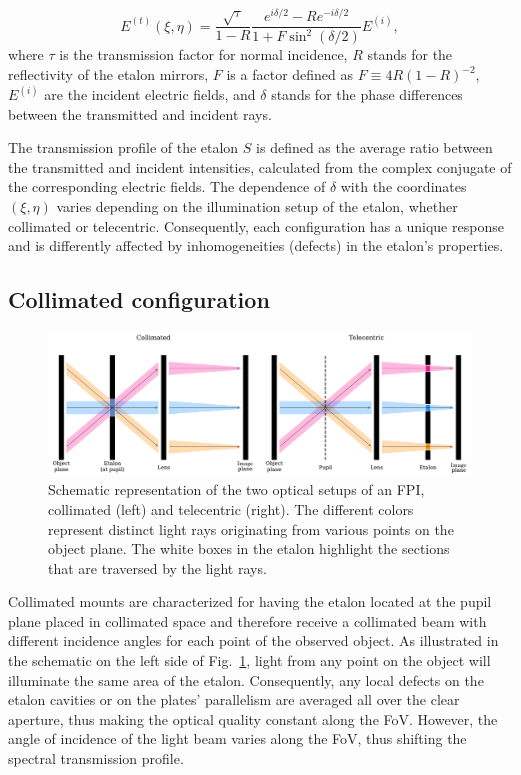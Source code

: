 \begin{equation}
  E ^{(t)}(\xi, \eta) = \frac{\sqrt{\tau}}{1 - R}\frac{e ^{i\delta / 2} - R e ^{ -i\delta / 2}}{1 + F \sin ^2 (\delta / 2)}E ^{(i)},
  \label{eq_etalon_theory: electric_transmitted}
\end{equation}
where $\tau$ is the transmission factor for normal incidence, $R$ stands for the reflectivity of the etalon mirrors, $F$ is a factor defined as $F \equiv 4R (1 - R )^{-2}$, $E^{(i)}$ are the incident electric fields, and $\delta$ stands for the phase differences between the transmitted and incident rays. 

The transmission profile of the etalon $S$ is defined as the average ratio between the transmitted and incident intensities, calculated from the complex conjugate of the corresponding electric fields. The dependence of $\delta$ with the coordinates $(\xi, \eta)$ varies depending on the illumination setup of the etalon, whether collimated or telecentric. Consequently, each configuration has a unique response and is differently affected by inhomogeneities (defects) in the etalon's properties.

\subsection{\label{susec_etalon_theory: collimated}Collimated configuration}

\begin{figure}
  \centering
  \includegraphics[width = \textwidth]{figures/EtalonChallenges/EtalonConfigurations.pdf}
  \caption[Etalon's configuration schematic.]{Schematic representation of the two optical setups of an FPI, collimated (left) and telecentric (right). The different colors represent distinct light rays originating from various points on the object plane. The white boxes in the etalon highlight the sections that are traversed by the light rays.
  } \label{fig_etalon_theory: Etalon configurations}
\end{figure}

Collimated mounts are characterized for having the etalon located at the pupil plane placed in collimated space and therefore receive a collimated beam with different incidence angles for each point of the observed object. As illustrated in the schematic on the left side of Fig.~{\ref{fig_etalon_theory: Etalon configurations}}, light from any point on the object will illuminate the same area of the etalon. Consequently, any local defects on the etalon cavities or on the plates' parallelism are averaged all over the clear aperture, thus making the optical quality constant along the FoV. However, the angle of incidence of the light beam varies along the FoV, thus shifting the spectral transmission profile.  

